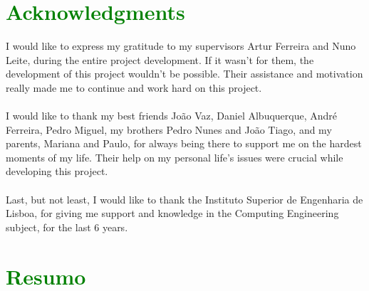 \chapter*{\textcolor{green}{Acknowledgments}}

I would like to express my gratitude to my supervisors Artur Ferreira and Nuno Leite, during the entire project development. If it wasn't for them, the development of this project wouldn't be possible. Their assistance and motivation really made me to continue and work hard on this project.\\
\\
I would like to thank my best friends João Vaz, Daniel Albuquerque, André Ferreira, Pedro Miguel, my brothers Pedro Nunes and João Tiago, and my parents, Mariana and Paulo, for always being there to support me on the hardest moments of my life. Their help on my personal life's issues were crucial while developing this project.\\
\\
Last, but not least, I would like to thank the Instituto Superior de Engenharia de Lisboa, for giving me support and knowledge in the Computing Engineering subject, for the last 6 years.
\
\chapter*{\textcolor{green}{Resumo}}

